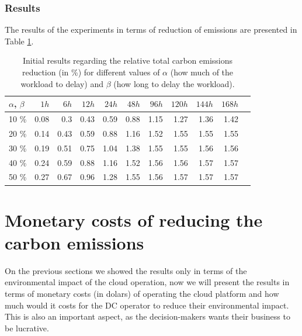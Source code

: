 \subsubsection{Results}

 The results of the experiments in terms of reduction of  emissions are presented in Table \ref{tab:flex_scheduling}.

  \begin{table}[H]
    \caption{Initial results regarding the relative total carbon emissions reduction (in \%) for different values of $\alpha$ (how much of the workload to delay) and $\beta$ (how long to delay the workload).}\centering
    \label{tab:flex_scheduling}
    \begin{tabular}{|l|r|r|r|r|r|r|r|r|r|r|}
      \hline
      $\alpha$, $\beta$ &   \textbf{$ 1 h $} &   \textbf{$ 6 h $} &  \textbf{$ 12 h $} &  \textbf{$ 24 h $} &  \textbf{$ 48 h $} &  \textbf{$ 96 h$} &   \textbf{$ 120 h $} &   \textbf{$ 144 h$} &   \textbf{$ 168 h$}\\ 
      \hline
      10 \%   &  0.08 &  0.3 &  0.43 &  0.59 &  0.88 &  1.15 &  1.27 &  1.36 &  1.42 \\ 
      \hline
      20 \%   &  0.14 &  0.43 &  0.59 &  0.88 &  1.16 &  1.52 &  1.55 &  1.55 &  1.55 \\ 
      \hline
       30 \%   &  0.19 &  0.51 &  0.75 &  1.04 &  1.38 &  1.55 &  1.55 &  1.56 &  1.56 \\ 
      \hline
       40 \%  &  0.24 &  0.59 &  0.88 &  1.16 &  1.52 &  1.56 &  1.56 &  1.57 &  1.57 \\ 
      \hline
       50 \%   &  0.27 &  0.67 &  0.96 &  1.28 &  1.55 &  1.56 &  1.57 &  1.57 &  1.57 \\ 
      \hline
    \end{tabular}
  \end{table}

\section{ Monetary costs of reducing the carbon emissions}

On the previous sections we showed the results only in terms of the environmental impact of the cloud operation, now we will present the results in terms of monetary costs (in dolars) of operating the cloud platform and how much would it costs for the DC operator to reduce their environmental impact. This is also an important aspect, as the decision-makers wants their business to be lucrative.

